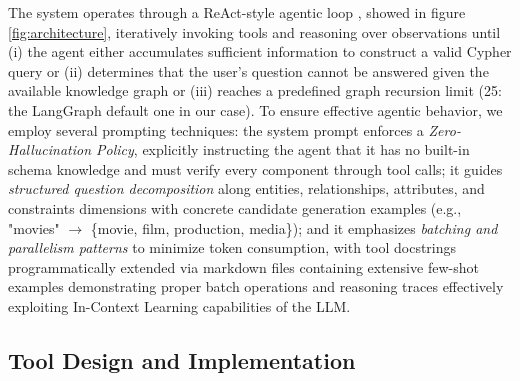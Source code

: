 The system operates through a ReAct-style agentic loop \cite{yao-etal-2023-react}, showed in figure \ref{fig:architecture}, iteratively invoking tools and reasoning over observations until (i) the agent either accumulates sufficient information to construct a valid Cypher query or (ii) determines that the user's question cannot be answered given the available knowledge graph or (iii) reaches a predefined graph recursion limit (25: the LangGraph default one in our case). To ensure effective agentic behavior, we employ several prompting techniques: the system prompt enforces a \textit{Zero-Hallucination Policy}, explicitly instructing the agent that it has no built-in schema knowledge and must verify every component through tool calls; it guides \textit{structured question decomposition} along entities, relationships, attributes, and constraints dimensions with concrete candidate generation examples (e.g., "movies" $\rightarrow$ \{movie, film, production, media\}); and it emphasizes \textit{batching and parallelism patterns} to minimize token consumption, with tool docstrings programmatically extended via markdown files containing extensive few-shot examples demonstrating proper batch operations and reasoning traces effectively exploiting In-Context Learning capabilities of the LLM.

\subsection{Tool Design and Implementation}


